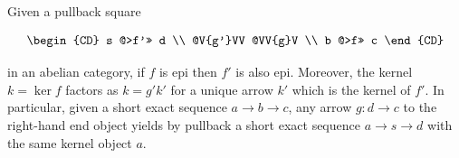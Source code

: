 Given a pullback square

$$\begin{CD}
s @>f'>> d \\
@V{g'}VV @VV{g}V \\
b @>f>> c
\end{CD}$$

in an abelian category, if $f$ is epi then $f'$ is also epi. Moreover, the kernel $k = \ker f$ factors as $k = g' k'$ for a unique arrow $k'$ which is the kernel of $f'$. In particular, given a short exact sequence $a \rightarrow b \rightarrow c$, any arrow $g : d \rightarrow c$ to the right-hand end object yields by pullback a short exact sequence $a \rightarrow s \rightarrow d$ with the same kernel object $a$.
